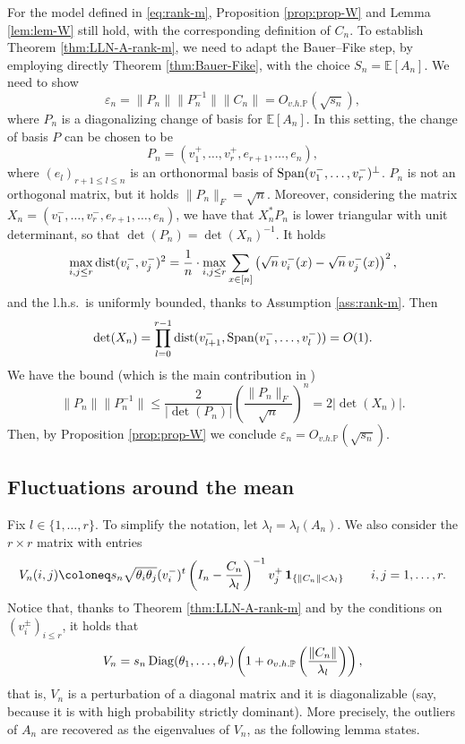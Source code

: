 \documentclass[11pt,oneside]{amsart}
\theoremstyle{plain}
\numberwithin{equation}{section}
\newcommand{\lhs}{{l.h.s.~}}
\newcommand{\eps}{\varepsilon}
\newcommand{\E}{\mathbb{E}}
\newcommand{\p}{\mathbb{P}}
\newcommand{\one}{\textup{\textbf{1}}}
\newcommand{\centered}{C_n}
\newcommand{\deterministic}{S_n}
\newcommand{\scaling}{s_n}
\newcommand{\ohp}{o_{v.h.\p}}
\newcommand{\Ohp}{O_{v.h.\p}}
\begin{document}
For the model defined in \eqref{eq:rank-m}, Proposition \ref{prop:prop-W} and Lemma \ref{lem:lem-W} still hold, with the corresponding definition of $\centered$. To establish Theorem \ref{thm:LLN-A-rank-m}, we need to adapt the Bauer--Fike step, by employing directly Theorem \ref{thm:Bauer-Fike}, with the choice $\deterministic=\E[A_n]$. We need to show $$\eps_n=\|P_n\|\|P_n^{-1}\|\|\centered\| = \Ohp(\sqrt{\scaling}),$$ where $P_n$ is a diagonalizing change of basis for $\E[A_n]$.
In this setting, the change of basis $P$ can be chosen to be
 $$P_n= (v_1^+,\dots,v_r^+, e_{r+1}, \dots, e_{n}),$$
 where $(e_{l})_{r+1 \le l \le n}$ is an orthonormal basis of ${\rm Span}(v_1^-,\dots,v_r^-)^{\perp}$. $P_n$ is not an orthogonal matrix, but it holds $\|P_n\|_{F}=\sqrt{n}$. Moreover, considering the matrix $X_n=(v_1^-,\dots,v_r^-, e_{r+1}, \dots, e_{n})$,
 we have that $X_n^*P_n$ is lower triangular with unit determinant, so that $\det(P_n)= \det(X_n)^{-1}$.
 It holds
 \begin{equation} \label{eq:used}
 \max_{i,j \le r} {\rm dist}(v_{i}^-, v_{j}^-)^2
 =\frac1n\cdot \max_{i,j \le r} \sum_{x \in [n]}\left(\sqrt{n}\,v_{i}^-(x)- \sqrt{n}\,v_{j}^-(x)\right)^2,\end{equation}
 and the \lhs is uniformly bounded, thanks to Assumption \ref{ass:rank-m}. Then
 $$\det(X_n)= \prod_{l=0}^{r-1} {\rm dist}(v_{l+1}^-, {\rm Span}(v_1^-,\dots,v_l^-))= O(1).$$
We have the bound (which is the main contribution in \cite{GEJ})
\begin{equation} \label{eq:X_n}
    \|P_n\|\|P_n^{-1}\|\le \frac{2}{|\det(P_n)|}\left(\frac{\|P_n\|_F}{\sqrt n}\right)^n = {2|\det(X_n)|}.
\end{equation}
Then, by Proposition \ref{prop:prop-W} we conclude $\eps_n=\Ohp(\sqrt{\scaling})$.

\subsection{Fluctuations around the mean}
Fix $l \in \{1,\dots,r\}$. To simplify the notation, let $\lambda_l=\lambda_{l}(A_n)$. We also consider the $r \times r$ matrix with entries
\begin{equation} \label{eq:V-diag}
     V_n(i,j)\coloneq\scaling \sqrt{\theta_i \theta_j} (v_i^-)^t\left(I_n - \frac{\centered}{\lambda_l}\right)^{-1}v_j^+ \,\one_{\{\|C_n\|<\lambda_l\}}\, \qquad i,j =1,\dots,r.
\end{equation}
Notice that, thanks to Theorem \ref{thm:LLN-A-rank-m} and by the conditions on $(v_i^\pm)_{i \le r}$, it holds that
\begin{equation} \label{eq:V-id}
    V_n=\scaling \, {\rm Diag}(\theta_1,\dots,\theta_r) \left(1+\ohp\left(\frac{\|\centered\|}{\lambda_l}\right)\right),
\end{equation}
that is, $V_n$ is a perturbation of a diagonal matrix and it is diagonalizable (say, because it is with high probability strictly dominant).
More precisely, the outliers of $A_n$ are recovered as the eigenvalues of $V_n$, as the following lemma states.
\end{document}
